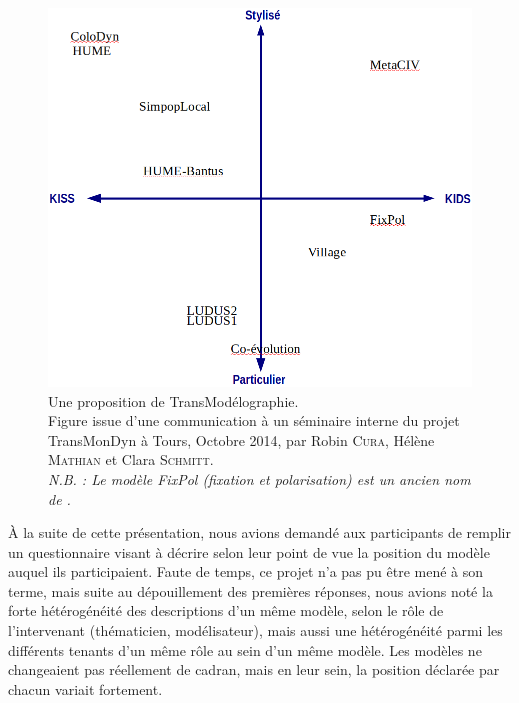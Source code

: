 \begin{figure}[H]
	\centering
	\includegraphics[width=\linewidth]{img/transmodelographie.png}
	\caption[Une proposition de \og TransModélographie\fg{}.]{Une proposition de \og TransModélographie\fg{}.\\
	Figure issue d'une communication à un séminaire interne du projet TransMonDyn à Tours, Octobre 2014, par Robin \textsc{Cura}, Hélène \textsc{Mathian} et Clara \textsc{Schmitt}.\\
	\textit{N.B. : Le modèle \og FixPol\fg{} (fixation et polarisation) est un ancien nom de \simfeodal{}.}}
	\label{fig:transmodelographie}
\end{figure}

À la suite de cette présentation, nous avions demandé aux participants de remplir un questionnaire visant à décrire selon leur point de vue la position du modèle auquel ils participaient.
Faute de temps, ce projet n'a pas pu être mené à son terme, mais suite au dépouillement des premières réponses, nous avions noté la forte hétérogénéité des descriptions d'un même modèle, selon le rôle de l'intervenant (thématicien, modélisateur), mais aussi une hétérogénéité parmi les différents tenants d'un même rôle au sein d'un même modèle.
Les modèles ne changeaient pas réellement de cadran, mais en leur sein, la position déclarée par chacun variait fortement.

